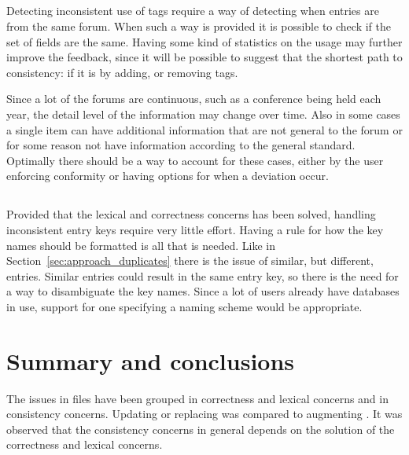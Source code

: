 \subsection{}

Detecting inconsistent use of tags require a way of detecting when
entries are from the same forum.  When such a way is provided it is
possible to check if the set of fields are the same.  Having some kind
of statistics on the usage may further improve the feedback, since it
will be possible to suggest that the shortest path to consistency: if
it is by adding, or removing tags.

Since a lot of the forums are continuous, such as a conference being
held each year, the detail level of the information may change over
time.  Also in some cases a single item can have additional
information that are not general to the forum or for some reason not
have information according to the general standard.  Optimally there
should be a way to account for these cases, either by the user
enforcing conformity or having options for when a deviation occur.


\subsection{}

Provided that the lexical and correctness concerns has been solved,
handling inconsistent entry keys require very little effort.  Having a
rule for how the key names should be formatted is all that is needed.
Like in Section~\ref{sec:approach_duplicates} there is the issue of
similar, but different, entries.  Similar entries could result in the
same entry key, so there is the need for a way to disambiguate the key
names.  Since a lot of users already have databases in use, support
for one specifying a naming scheme would be appropriate.


\section{Summary and conclusions}

The issues in {\bibtex} files have been grouped in correctness and
lexical concerns and in consistency concerns.  Updating or replacing
{\bibtex} was compared to augmenting {\bibtex}.  It was observed that
the consistency concerns in general depends on the solution of the
correctness and lexical concerns.

